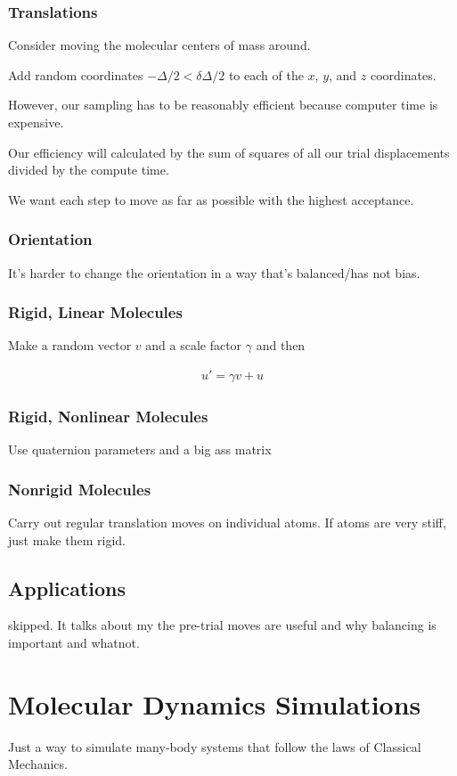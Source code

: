 \documentclass[fleqn]{report}
\newcommand{\equations} [1] {
\begin{gather*}
#1
\end{gather*}
}
\begin{document}
\subsection{Translations}
Consider moving the molecular centers of mass around. 

Add random coordinates $-\Delta/2 < \delta \Delta/2$ to each of 
the $x$, $y$, and $z$ coordinates.

However, our sampling has to be reasonably efficient because computer time 
is expensive. 

Our efficiency will calculated by the sum of squares of all our trial 
displacements divided by the compute time. 

We want each step to move as far as possible with the highest acceptance. 

\subsection{Orientation}
It's harder to change the orientation in a way that's balanced/has 
not bias. 

\subsection{Rigid, Linear Molecules}
Make a random vector $v$ and a scale factor $\gamma$ and then 
\equations{
    u' = \gamma v + u
}


\subsection{Rigid, Nonlinear Molecules}
Use quaternion parameters and a big ass matrix 

\subsection{Nonrigid Molecules}
Carry out regular translation moves on individual atoms. 
If atoms are very stiff, just make them rigid. 

\section{Applications}
skipped. It talks about my the pre-trial moves are useful and 
why balancing is important and whatnot.  

\chapter{Molecular Dynamics Simulations}
Just a way to simulate many-body systems that follow the laws of 
Classical Mechanics. 
\end{document}
